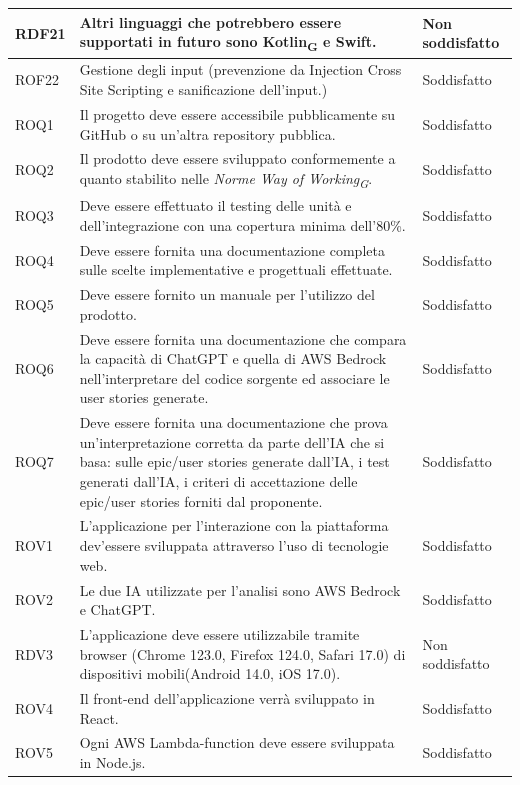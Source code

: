 \documentclass{article}
\begin{document}
\begin{center}
    \begin{tabular}{|P{2cm}| P{10cm}| P{4cm}|}
\hline
{}
RDF21 & Altri linguaggi che potrebbero essere supportati in futuro sono Kotlin\textsubscript{G} e Swift.& Non soddisfatto\\
\hline
{}
ROF22 & Gestione degli input (prevenzione da Injection Cross Site Scripting e sanificazione dell'input.) & Soddisfatto \\
\hline
{}
ROQ1& Il progetto deve essere accessibile pubblicamente su GitHub o su un'altra repository pubblica. & Soddisfatto\\ 
\hline
ROQ2 & Il prodotto deve essere sviluppato conformemente a quanto stabilito nelle \textit{Norme Way of Working\textsubscript{G}}.& Soddisfatto \\ 
\hline
ROQ3 & Deve essere effettuato il testing delle unità e dell'integrazione con una copertura minima dell'80\%.& Soddisfatto\\
\hline
{}
ROQ4 & Deve essere fornita una documentazione completa sulle scelte implementative e progettuali effettuate. & Soddisfatto\\
\hline
{}
ROQ5& Deve essere fornito un manuale per l'utilizzo del prodotto. & Soddisfatto\\
\hline
{}
ROQ6& Deve essere fornita una documentazione che compara la capacità di ChatGPT e quella di AWS Bedrock nell'interpretare del codice sorgente ed associare le user stories generate. & Soddisfatto\\
\hline
{}
ROQ7&  Deve essere fornita una documentazione che prova un'interpretazione corretta da parte dell'IA che si basa: sulle epic/user stories generate dall'IA, i test generati dall'IA, i criteri di accettazione delle epic/user stories forniti dal proponente. & Soddisfatto\\
\hline
ROV1& L'applicazione per l'interazione con la piattaforma dev'essere sviluppata attraverso l'uso di tecnologie web. & Soddisfatto\\ 
\hline
{}
ROV2& Le due IA utilizzate per l'analisi sono AWS Bedrock e ChatGPT. & Soddisfatto \\ 
\hline
RDV3& L'applicazione deve essere utilizzabile tramite browser (Chrome 123.0, Firefox 124.0, Safari 17.0) di dispositivi mobili(Android 14.0, iOS 17.0). & Non soddisfatto\\
\hline
{}
ROV4& Il front-end dell'applicazione verrà sviluppato in React. & Soddisfatto\\
\hline
ROV5& Ogni AWS Lambda-function deve essere sviluppata in Node.js.& Soddisfatto\\
\hline
\end{tabular}



\end{center}
\end{document}
